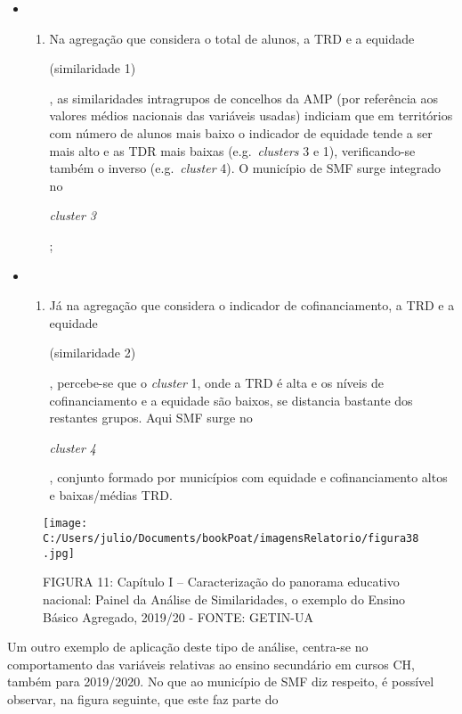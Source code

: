\documentclass[
]{book}
\providecommand{\tightlist}{%
  \setlength{\itemsep}{0pt}\setlength{\parskip}{0pt}}
\begin{document}
\begin{itemize}
\item
  \begin{enumerate}
  \def\labelenumi{\roman{enumi})}
  \tightlist
  \item
    Na agregação que considera o total de alunos, a TRD e a equidade

    (similaridade 1)

    , as similaridades intragrupos de concelhos da AMP (por referência aos valores médios nacionais das variáveis usadas) indiciam que em territórios com número de alunos mais baixo o indicador de equidade tende a ser mais alto e as TDR mais baixas (e.g.~\emph{clusters} 3 e 1), verificando-se também o inverso (e.g.~\emph{cluster} 4). O município de SMF surge integrado no

    \emph{cluster 3}

    ;
  \end{enumerate}
\item
  \begin{enumerate}
  \def\labelenumi{\roman{enumi})}
  \setcounter{enumi}{1}
  \tightlist
  \item
    Já na agregação que considera o indicador de cofinanciamento, a TRD e a equidade

    (similaridade 2)

    , percebe-se que o \emph{cluster} 1, onde a TRD é alta e os níveis de cofinanciamento e a equidade são baixos, se distancia bastante dos restantes grupos. Aqui SMF surge no

    \emph{cluster 4}

    , conjunto formado por municípios com equidade e cofinanciamento altos e baixas/médias TRD.
  \end{enumerate}
\end{itemize}

\begin{figure}
\centering
\texttt{[image: C:/Users/julio/Documents/bookPoat/imagensRelatorio/figura38.jpg]}
\caption{FIGURA 11: Capítulo I -- Caracterização do panorama educativo nacional: Painel da Análise de Similaridades, o exemplo do Ensino Básico Agregado, 2019/20 - FONTE: GETIN-UA}
\end{figure}

Um outro exemplo de aplicação deste tipo de análise, centra-se no comportamento das variáveis relativas ao ensino secundário em cursos CH, também para 2019/2020. No que ao município de SMF diz respeito, é possível observar, na figura seguinte, que este faz parte do
\end{document}
